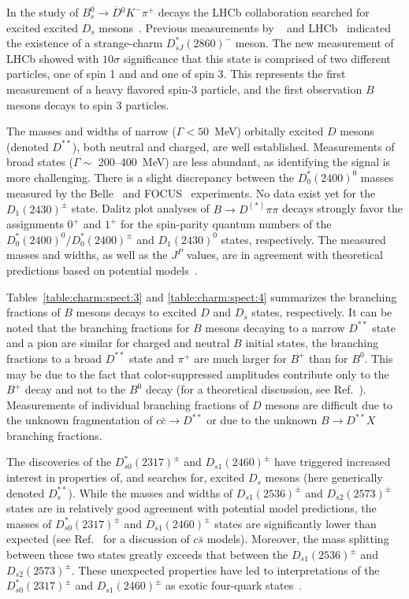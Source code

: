 In the study of $B_{s}^{0}\to \overline{D}{}^{0}K^{-}\pi^{+}$ decays the LHCb collaboration searched for excited excited  $D_{s}$ mesons~\cite{Aaij:2014xza}.  Previous measurements by \babar{}~\cite{Aubert:2009ah} and LHCb~\cite{Aaij:2012pc} indicated the existence of a strange-charm $D^{*}_{sJ}(2860)^{-}$ meson. The new measurement of LHCb showed with $10\sigma$ significance that this state is comprised of two different particles,  one of spin 1 and and one of spin 3. This represents the first measurement of a heavy flavored spin-3 particle, and the first observation $B$ mesons decays to spin 3 particles.

The masses and widths of narrow ($\Gamma<50$~MeV) orbitally excited $D$ mesons (denoted $D^{\ast\ast}$), both neutral and charged, are well established. Measurements of broad states ($\Gamma\sim$ 200--400~MeV) are less abundant, as identifying the signal is more challenging. There is a slight discrepancy between the 
$D_0^\ast(2400)^0$ masses measured by the Belle~\cite{Abe:2003zm} and  FOCUS~\cite{Link:2003bd} experiments. No data exist yet for the $D_1(2430)^{\pm}$ state. Dalitz plot analyses of $B\to D^{(\ast)}\pi\pi$ decays strongly favor the assignments $0^+$ and $1^+$ for the spin-parity quantum numbers of the $D_0^\ast(2400)^0/D_0^\ast(2400)^\pm$ and $D_1(2430)^{0}$ states, respectively. The measured masses and widths, as well as the $J^P$ values, are in agreement with theoretical predictions based on potential models~\cite{Godfrey:1985xj, Godfrey:1986wj, Isgur:1991wq, Schweitzer:2002nm}. 


Tables~\ref{table:charm:spect:3} and \ref{table:charm:spect:4} summarizes the branching fractions of $B$ mesons decays to excited $D$ and $D_{s}$ states, respectively. It can be noted that the branching fractions for $B$ mesons decaying to a narrow $D^{\ast\ast}$ state and a pion are similar for charged and neutral $B$ initial states, the branching fractions to a broad $D^{\ast\ast}$ state and $\pi^+$ are much larger for $B^+$ than for $B^0$. This may be due to the fact that color-suppressed amplitudes contribute only to the $B^+$ decay and not to the $B^0$ decay (for a theoretical discussion, see Ref.~\citep{Jugeau:2005yr,Colangelo:2004vu}). Measurements of individual branching fractions of $D$ mesons are difficult due to the unknown fragmentation of $c\bar c \to D^{\ast\ast}$ or due to the unknown $B \to D^{\ast\ast} X$ branching fractions.

The discoveries of the $D_{s0}^\ast(2317)^{\pm}$ and $D_{s1}(2460)^{\pm}$ have triggered increased interest in properties of, and searches for, excited $D_s$ mesons (here generically denoted $D_s^{\ast\ast}$). While the masses and widths of $D_{s1}(2536)^{\pm}$ and $D_{s2}(2573)^{\pm}$ states are in relatively good agreement with potential model predictions, the masses of $D_{s0}^\ast(2317)^{\pm}$ and $D_{s1}(2460)^{\pm}$ states are significantly lower than expected (see Ref.~\cite{Cahn:2003cw} for a discussion of $c\bar{s}$ models). Moreover, the mass splitting between these two states greatly exceeds that between the $D_{s1}(2536)^{\pm}$ and $D_{s2}(2573)^{\pm}$. These unexpected properties have led to interpretations of the $D_{s0}^\ast(2317)^{\pm}$ and $D_{s1}(2460)^{\pm}$ as exotic four-quark states~\cite{Barnes:2003dj,Lipkin:2003zk}.

